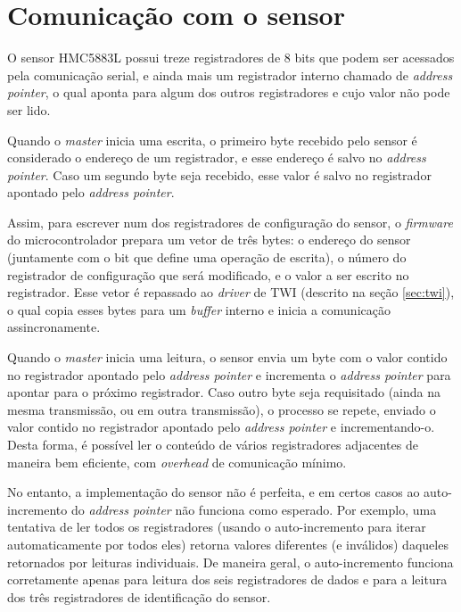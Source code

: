 \documentclass[brazil,pagestart=firstchapter]{abnt}
\begin{document}
\section{Comunicação com o sensor}
\label{sec:software_sensor}

O sensor HMC5883L possui treze registradores de 8 bits que podem ser
acessados pela comunicação serial, e ainda mais um registrador interno
chamado de \textit{address pointer}, o qual aponta para algum dos outros
registradores e cujo valor não pode ser lido. \cite[p.~11]{HMC5883L}

Quando o \textit{master} inicia uma escrita, o primeiro byte recebido pelo
sensor é considerado o endereço de um registrador, e esse endereço é salvo
no \textit{address pointer}. Caso um segundo byte seja recebido, esse valor
é salvo no registrador apontado pelo \textit{address pointer}.

Assim, para escrever num dos registradores de configuração do sensor, o
\textit{firmware} do microcontrolador prepara um vetor de três bytes: o
endereço do sensor (juntamente com o bit que define uma operação de
escrita), o número do registrador de configuração que será modificado, e o
valor a ser escrito no registrador. Esse vetor é repassado ao
\textit{driver} de \ac{TWI} (descrito na seção \ref{sec:twi}), o qual copia
esses bytes para um \textit{buffer} interno e inicia a comunicação
assincronamente.

Quando o \textit{master} inicia uma leitura, o sensor envia um byte com o
valor contido no registrador apontado pelo \textit{address pointer} e
incrementa o \textit{address pointer} para apontar para o próximo
registrador. Caso outro byte seja requisitado (ainda na mesma transmissão,
ou em outra transmissão), o processo se repete, enviado o valor contido no
registrador apontado pelo \textit{address pointer} e incrementando-o. Desta
forma, é possível ler o conteúdo de vários registradores adjacentes de
maneira bem eficiente, com \textit{overhead} de comunicação mínimo.

No entanto, a implementação do sensor não é perfeita, e em certos casos ao
auto-incremento do \textit{address pointer} não funciona como esperado. Por
exemplo, uma tentativa de ler todos os registradores (usando o
auto-incremento para iterar automaticamente por todos eles) retorna valores
diferentes (e inválidos) daqueles retornados por leituras individuais. De
maneira geral, o auto-incremento funciona corretamente apenas para leitura
dos seis registradores de dados e para a leitura dos três registradores de
identificação do sensor.
\end{document}

